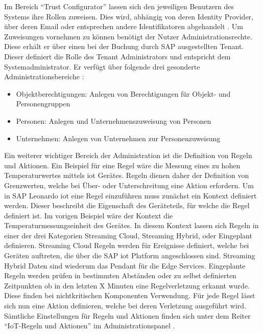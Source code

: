 \noindent Im Bereich "`Trust Configurator"' lassen sich den jeweiligen Benutzern des Systems ihre Rollen zuweisen. Dies wird, abhängig von deren Identity Provider, über deren Email oder entsprechen andere Identifikatoren abgehandelt \cite[Seite 209f]{Holtschulte20:IOS}. Um Zuweisungen vornehmen zu können benötigt der Nutzer Administrationsrechte. Diese erhält er über einen bei der Buchung durch SAP ausgestellten Tenant. Dieser definiert die Rolle des Tenant Administrators und entspricht dem Systemadministrator. Er verfügt über folgende drei gesonderte Administrationsbereiche \cite[Seiten 220 - 221, 223]{Holtschulte20:IOS}:
\begin{itemize}
	\item{Objektberechtigungen: Anlegen von Berechtigungen für Objekt- und Personengruppen}
	\item{Personen: Anlegen und Unternehmenszuweisung von Personen}
	\item{Unternehmen: Anlegen von Unternehmen zur Personenzuweisung}
\end{itemize}

\noindent Ein weiterer wichtiger Bereich der Administration ist die Definition von Regeln und Aktionen. Ein Beispiel für eine Regel wäre die Messung eines zu hohen Temperaturwertes mittels \ac{iot} Gerätes. Regeln dienen daher der Definition von Grenzwerten, welche bei Über- oder Unterschreitung eine Aktion erfordern. Um in SAP Leonardo \ac{iot} eine Regel einzuführen muss zunächst ein Kontext definiert werden. Dieser beschreibt die Eigenschaft des Geräteteils, für welche die Regel definiert ist. Im vorigen Beispiel wäre der Kontext die Temperaturmessungseinheit des Gerätes. In diesem Kontext lassen sich Regeln in einer der drei Kategorien Streaming Cloud, Streaming Hybrid, oder Eingeplant definieren. Streaming Cloud Regeln werden für Ereignisse definiert, welche bei Geräten auftreten, die über die SAP \ac{iot} Platform angeschlossen sind. Streaming Hybrid Daten sind wiederum das Pendant für die Edge Services. Eingeplante Regeln werden prüfen in bestimmten Abständen oder zu selbst definierten Zeitpunkten ob in den letzten X Minuten eine Regelverletzung erkannt wurde. Diese finden bei nichtkritischen Komponenten Verwendung. Für jede Regel lässt sich nun eine Aktion definieren, welche bei deren Verletzung ausgeführt wird. Sämtliche Einstellungen für Regeln und Aktionen finden sich unter dem Reiter "`IoT-Regeln und Aktionen"' im Administrationspanel \cite[Seite 224ff]{Holtschulte20:IOS}.\\   

